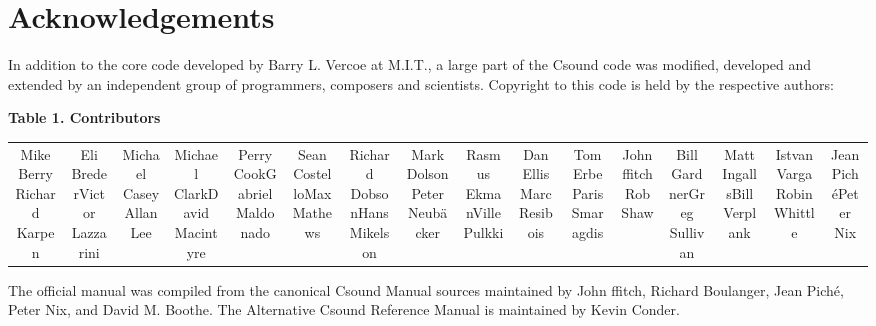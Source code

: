 \begin{comment}
\documentclass[10pt]{article}
\usepackage{fullpage, graphicx, url}
\setlength{\parskip}{1ex}
\setlength{\parindent}{0ex}
\title{Acknowledgements}



\begin{tabular}{ccc}
The Alternative Csound Reference Manual & & \\
Previous &Preface &Next

\end{tabular}

\end{comment}
\section{Acknowledgements}


  In addition to the core code developed by Barry L. Vercoe at M.I.T., a large part of the Csound code was modified, developed and extended by an independent group of programmers, composers and scientists. Copyright to this code is held by the respective authors: 


 \textbf{Table 1. Contributors}



\begin{tabular}{cccccccccccccccc}
Mike BerryRichard Karpen &Eli BrederVictor Lazzarini &Michael CaseyAllan Lee &Michael ClarkDavid Macintyre &Perry CookGabriel Maldonado &Sean CostelloMax Mathews &Richard DobsonHans Mikelson &Mark DolsonPeter Neub\"acker &Rasmus EkmanVille Pulkki &Dan EllisMarc Resibois &Tom ErbeParis Smaragdis &John ffitchRob Shaw &Bill GardnerGreg Sullivan &Matt IngallsBill Verplank &Istvan VargaRobin Whittle &Jean Pich\'ePeter Nix

\end{tabular}



  The official manual was compiled from the canonical Csound Manual sources maintained by John ffitch, Richard Boulanger, Jean Pich\'e, Peter Nix, and David M. Boothe. The Alternative Csound Reference Manual is maintained by Kevin Conder. 


\begin{comment}
\begin{tabular}{lcr}
Previous &Home &Next \\
Copyright Notice &Up &Why is this called the \emph{Alternative}
 Csound Reference Manual?

\end{tabular}



\end{comment}
